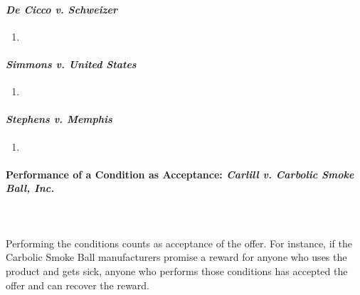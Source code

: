 \paragraph{\emph{De Cicco v.  Schweizer}}

\begin{enumerate}
    \item %
\end{enumerate}

\paragraph{\emph{Simmons v. United States}}

\begin{enumerate}
    \item %
\end{enumerate}

\paragraph{\emph{Stephens v. Memphis}}

\begin{enumerate}
    \item %
\end{enumerate}

\newpage %

\paragraph{Performance of a Condition as Acceptance: \emph{Carlill v. Carbolic 
Smoke Ball, Inc.}}
~\\\\
Performing the conditions counts as acceptance of the offer. For 
instance, if the Carbolic Smoke Ball manufacturers promise a reward for anyone 
who uses the product and gets sick, anyone who performs those conditions has 
accepted the offer and can recover the reward.

